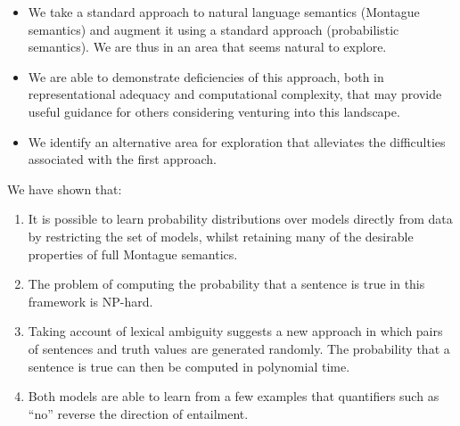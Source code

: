 \documentclass[a4paper,11pt]{article}
\theoremstyle{definition}
\begin{document}
\begin{itemize}
\item We take a standard approach to natural language semantics
  (Montague semantics) and augment it using a standard approach
  (probabilistic semantics). We are thus in an area that seems natural
  to explore.
\item We are able to demonstrate deficiencies of this approach, both
  in representational adequacy and computational complexity, that may provide
  useful guidance for others considering venturing into this
  landscape.
\item We identify an alternative area for exploration that alleviates
  the difficulties associated with the first approach.
\end{itemize}

We have shown that:

\begin{enumerate}
\item It is possible to learn probability
  distributions over models directly from data by restricting the set of models,
  whilst retaining many of the desirable properties of full Montague
  semantics.
\item The problem of computing the probability that a
  sentence is true in this framework is NP-hard.
\item Taking account of lexical ambiguity suggests a new
  approach in which pairs of sentences and truth values are generated
  randomly. The probability that a sentence is true can then be
  computed in polynomial time.
\item Both models are able to learn from a few examples
  that quantifiers such as ``no'' reverse the direction of entailment.
\end{enumerate}

%
\end{document}
